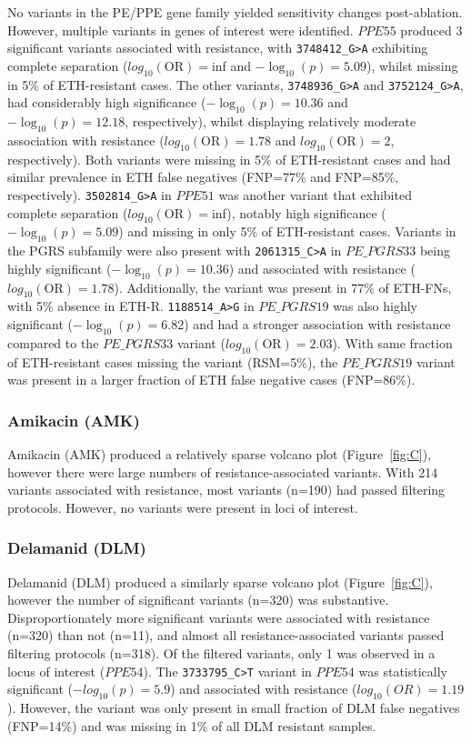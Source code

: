 No variants in the PE/PPE gene family yielded sensitivity changes post-ablation. However, multiple variants in genes of interest were identified. $PPE55$ produced 3 significant variants associated with resistance, with \texttt{3748412\_G>A} exhibiting complete separation ($log_{10}(\text{OR})=$inf and $-\log_{10}(p)=5.09$), whilst missing in 5\% of ETH-resistant cases. The other variants, \texttt{3748936\_G>A} and \texttt{3752124\_G>A}, had considerably high significance ($-\log_{10}(p)=10.36$ and $-\log_{10}(p)=12.18$, respectively), whilst displaying relatively moderate association with resistance ($log_{10}(\text{OR})=1.78$ and $log_{10}(\text{OR})=2$, respectively). Both variants were missing in 5\% of ETH-resistant cases and had similar prevalence in ETH false negatives (FNP=77\% and FNP=85\%, respectively). \texttt{3502814\_G>A} in $PPE51$ was another variant that exhibited complete separation ($log_{10}(\text{OR})=$inf), notably high significance ($-\log_{10}(p)=5.09$) and missing in only 5\% of ETH-resistant cases. Variants in the PGRS subfamily were also present with \texttt{2061315\_C>A} in $PE\_PGRS33$ being highly significant ($-\log_{10}(p)=10.36$) and associated with resistance ($log_{10}(\text{OR})=1.78$). Additionally, the variant was present in 77\% of ETH-FNs, with 5\% absence in ETH-R. \texttt{1188514\_A>G} in $PE\_PGRS19$ was also highly significant ($-\log_{10}(p)=6.82$) and had a stronger association with resistance compared to the $PE\_PGRS33$ variant ($log_{10}(\text{OR})=2.03$). With same fraction of ETH-resistant cases missing the variant (RSM=5\%), the $PE\_PGRS19$ variant was present in a larger fraction of ETH false negative cases (FNP=86\%). 


\subsubsection{Amikacin (AMK)}
Amikacin (AMK) produced a relatively sparse volcano plot (Figure~\ref{fig:C}), however there were large numbers of resistance-associated variants. With 214 variants associated with resistance, most variants (n=190) had passed filtering protocols. However, no variants were present in loci of interest.

\subsubsection{Delamanid (DLM)}
Delamanid (DLM) produced a similarly sparse volcano plot (Figure~\ref{fig:C}), however the number of significant variants (n=320) was substantive. Disproportionately more significant variants were associated with resistance (n=320) than not (n=11), and almost all resistance-associated variants passed filtering protocols (n=318). Of the filtered variants, only 1 was observed in a locus of interest ($PPE54$). The \texttt{3733795\_C>T} variant in $PPE54$ was statistically significant ($-log_{10}(p)=5.9$) and associated with resistance ($log_{10}(OR)=1.19$). However, the variant was only present in small fraction of DLM false negatives (FNP=14\%) and was missing in 1\% of all DLM resistant samples. 

